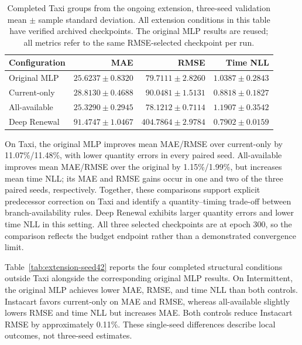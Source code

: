 \documentclass[runningheads]{llncs}
\begin{document}
\begin{table}[h]
\caption{Completed Taxi groups from the ongoing extension, three-seed
validation mean $\pm$ sample standard deviation. All extension conditions
in this table have verified archived checkpoints. The original MLP results
are reused; all metrics refer to the same RMSE-selected checkpoint per run.}
\label{tab:extension}\centering\small
\begin{tabular}{lrrr}
\toprule
Configuration & MAE & RMSE & Time NLL\\
\midrule
Original MLP & $25.6237\pm0.8320$ & $79.7111\pm2.8260$ & $1.0387\pm0.2843$\\
Current-only & $28.8130\pm0.4688$ & $90.0481\pm1.5131$ & $0.8818\pm0.1827$\\
All-available & $25.3290\pm0.2945$ & $78.1212\pm0.7114$ & $1.1907\pm0.3542$\\
Deep Renewal & $91.4747\pm1.0467$ & $404.7864\pm2.9784$ & $0.7902\pm0.0159$\\
\bottomrule
\end{tabular}
\end{table}

On Taxi, the original MLP improves mean MAE/RMSE over current-only by
11.07\%/11.48\%, with lower quantity errors in every paired seed.
All-available improves mean MAE/RMSE over the original by 1.15\%/1.99\%,
but increases mean time NLL; its MAE and RMSE gains occur in one and two
of the three paired seeds, respectively. Together, these comparisons support
explicit predecessor correction on Taxi and identify a quantity--timing
trade-off between branch-availability rules. Deep Renewal exhibits larger
quantity errors and lower time NLL in this setting. All three selected
checkpoints are at epoch 300, so the comparison reflects the budget endpoint
rather than a demonstrated convergence limit.

Table~\ref{tab:extension-seed42} reports the four completed structural
conditions outside Taxi alongside the corresponding original MLP results.
On Intermittent, the original MLP achieves lower MAE, RMSE, and time NLL than
both controls. Instacart favors current-only on MAE and RMSE, whereas
all-available slightly lowers RMSE and time NLL but increases MAE. Both
controls reduce Instacart RMSE by approximately 0.11\%. These single-seed
differences describe local outcomes, not three-seed estimates.
\end{document}
